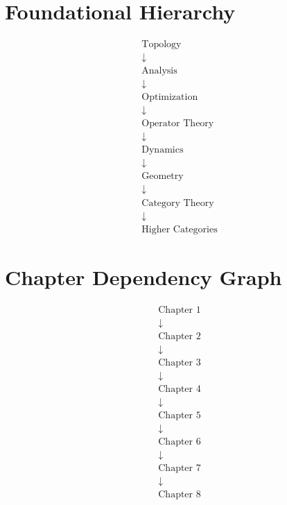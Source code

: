 \documentclass[11pt]{book}
\numberwithin{equation}{chapter}
\theoremstyle{definition}
\theoremstyle{plain}
\begin{document}

\section{Foundational Hierarchy}

\[
\begin{array}{c}
\text{Topology}
\\
\downarrow
\\
\text{Analysis}
\\
\downarrow
\\
\text{Optimization}
\\
\downarrow
\\
\text{Operator Theory}
\\
\downarrow
\\
\text{Dynamics}
\\
\downarrow
\\
\text{Geometry}
\\
\downarrow
\\
\text{Category Theory}
\\
\downarrow
\\
\text{Higher Categories}
\end{array}
\]


\section{Chapter Dependency Graph}

\[
\begin{array}{c}
\text{Chapter 1}
\\
\downarrow
\\
\text{Chapter 2}
\\
\downarrow
\\
\text{Chapter 3}
\\
\downarrow
\\
\text{Chapter 4}
\\
\downarrow
\\
\text{Chapter 5}
\\
\downarrow
\\
\text{Chapter 6}
\\
\downarrow
\\
\text{Chapter 7}
\\
\downarrow
\\
\text{Chapter 8}
\end{array}
\]
\end{document}
